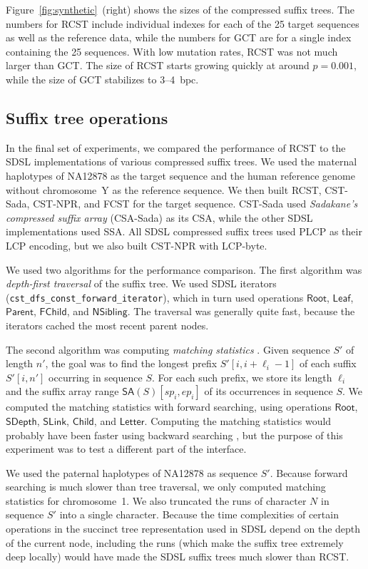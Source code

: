 \documentclass[a4paper,11pt]{llncs}
\newcommand{\CSTsada}{\textsf{CST\nobreakdash-Sada}}
\newcommand{\GCT}{\textsf{GCT}}
\newcommand{\FCST}{\textsf{FCST}}
\newcommand{\CSTnpr}{\textsf{CST\nobreakdash-NPR}}
\newcommand{\RCST}{\textsf{RCST}}
\newcommand{\CSA}{\textsf{CSA}}
\newcommand{\SSA}{\textsf{SSA}}
\newcommand{\CSAsada}{\textsf{CSA-Sada}}
\newcommand{\mSA}{\ensuremath{\mathsf{SA}}}
\newcommand{\LCP}{\textsf{LCP}}
\newcommand{\PLCP}{\textsf{PLCP}}
\newcommand{\LCPbyte}{\textsf{LCP\nobreakdash-byte}}
\newcommand{\mRoot}{\ensuremath{\mathsf{Root}}}
\newcommand{\mLeaf}{\ensuremath{\mathsf{Leaf}}}
\newcommand{\mParent}{\ensuremath{\mathsf{Parent}}}
\newcommand{\mFChild}{\ensuremath{\mathsf{FChild}}}
\newcommand{\mNSibling}{\ensuremath{\mathsf{NSibling}}}
\newcommand{\mSDepth}{\ensuremath{\mathsf{SDepth}}}
\newcommand{\mSLink}{\ensuremath{\mathsf{SLink}}}
\newcommand{\mChild}{\ensuremath{\mathsf{Child}}}
\newcommand{\mLetter}{\ensuremath{\mathsf{Letter}}}
\begin{document}
Figure~\ref{fig:synthetic}~(right) shows the sizes of the compressed suffix trees. The numbers for \RCST{} include individual indexes for each of the 25 target sequences as well as the reference data, while the numbers for \GCT{} are for a single index containing the 25 sequences. With low mutation rates, \RCST{} was not much larger than \GCT{}. The size of \RCST{} starts growing quickly at around $p = 0.001$, while the size of \GCT{} stabilizes to 3\nobreakdash--4~bpc.

\subsection{Suffix tree operations}

In the final set of experiments, we compared the performance of \RCST{} to the SDSL implementations of various compressed suffix trees. We used the maternal haplotypes of NA12878 as the target sequence and the human reference genome without chromosome~Y as the reference sequence. We then built \RCST, \CSTsada, \CSTnpr, and \FCST{} for the target sequence. \CSTsada{} used \emph{Sadakane's compressed suffix array} (\CSAsada) \cite{Sadakane2003} as its \CSA, while the other SDSL implementations used \SSA. All SDSL compressed suffix trees used \PLCP{} as their \LCP{} encoding, but we also built \CSTnpr{} with \LCPbyte.

We used two algorithms for the performance comparison. The first algorithm was \emph{depth-first traversal} of the suffix tree. We used SDSL iterators (\texttt{cst\_dfs\_const\_forward\_iterator}), which in turn used operations $\mRoot$, $\mLeaf$, $\mParent$, $\mFChild$, and $\mNSibling$. The traversal was generally quite fast, because the iterators cached the most recent parent nodes.

The second algorithm was computing \emph{matching statistics} \cite{Chang1994}. Given sequence $S'$ of length $n'$, the goal was to find the longest prefix $S'[i,i+\ell_{i}-1]$ of each suffix $S'[i,n']$ occurring in sequence $S$. For each such prefix, we store its length $\ell_{i}$ and the suffix array range $\mSA(S)[sp_{i},ep_{i}]$ of its occurrences in sequence $S$. We computed the matching statistics with forward searching, using operations $\mRoot$, $\mSDepth$, $\mSLink$, $\mChild$, and $\mLetter$. Computing the matching statistics would probably have been faster using backward searching \cite{Ohlebusch2010a}, but the purpose of this experiment was to test a different part of the interface.

We used the paternal haplotypes of NA12878 as sequence $S'$. Because forward searching is much slower than tree traversal, we only computed matching statistics for chromosome~1. We also truncated the runs of character $N$ in sequence $S'$ into a single character. Because the time complexities of certain operations in the succinct tree representation used in SDSL depend on the depth of the current node, including the runs (which make the suffix tree extremely deep locally) would have made the SDSL suffix trees much slower than \RCST.
\end{document}
